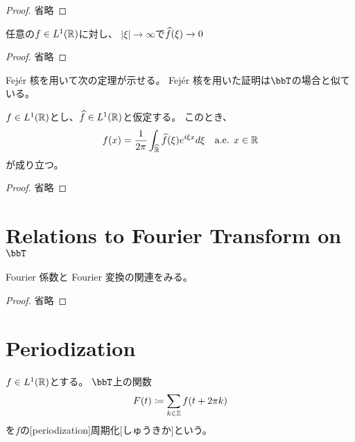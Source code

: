 \documentclass[report]{jlreq}
\begin{document}
\begin{proof}
    省略
\end{proof}

\begin{theorem}
    任意の$f \in L^1(\mathbb{R})$に対し、
    $|\xi| \to \infty$で$\widehat{f}(\xi) \to 0$
\end{theorem}

\begin{proof}
    省略
\end{proof}

Fej\'{e}r 核を用いて次の定理が示せる。
Fej\'{e}r 核を用いた証明は$\bbT$の場合と似ている。

\begin{theorem}[反転公式]
    $f \in L^1(\mathbb{R})$とし、$\widehat{f} \in L^1(\mathbb{R})$と仮定する。
    このとき、
    \begin{equation}
        f(x) = \frac{1}{2\pi} \int_{\widehat{\mathbb{R}}} \widehat{f}(\xi) e^{i\xi x} d\xi
            \quad \text{a.e. } x \in \mathbb{R}
    \end{equation}
    が成り立つ。
\end{theorem}

\begin{proof}
    省略
\end{proof}

%
\section{%
    \texorpdfstring{%
        Relations to Fourier Transform on $\bbT$%
    }{%
        Relations to Fourier Transform on T%
    }%
}

Fourier 係数と Fourier 変換の関連をみる。

\begin{theorem}[各点収束性]
    \TODO{}
\end{theorem}

\begin{proof}
    省略
\end{proof}

%
\section{Periodization}

\begin{definition}[周期化]
    $f \in L^1(\mathbb{R})$とする。
    $\bbT$上の関数
    \begin{equation}
        F(t) \coloneqq \sum_{k \in \mathbb{Z}} f(t + 2\pi k)
    \end{equation}
    を$f$の[periodization]{周期化}[しゅうきか]という。
\end{definition}
\end{document}
